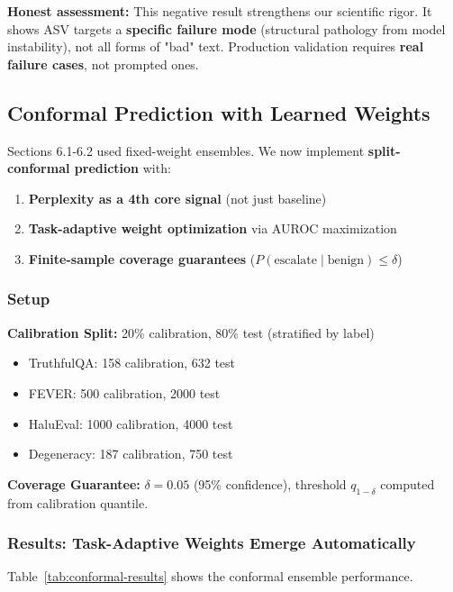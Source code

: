 \documentclass[11pt]{article}
\begin{document}
\textbf{Honest assessment:} This negative result strengthens our scientific rigor. It shows ASV targets a \textbf{specific failure mode} (structural pathology from model instability), not all forms of "bad" text. Production validation requires \textbf{real failure cases}, not prompted ones.

\subsection{Conformal Prediction with Learned Weights}
\label{sec:eval-conformal}

Sections 6.1-6.2 used fixed-weight ensembles. We now implement \textbf{split-conformal prediction} with:
\begin{enumerate}
\item \textbf{Perplexity as a 4th core signal} (not just baseline)
\item \textbf{Task-adaptive weight optimization} via AUROC maximization
\item \textbf{Finite-sample coverage guarantees} ($P(\text{escalate} \mid \text{benign}) \le \delta$)
\end{enumerate}

\subsubsection{Setup}

\textbf{Calibration Split:} 20\% calibration, 80\% test (stratified by label)
\begin{itemize}
\item TruthfulQA: 158 calibration, 632 test
\item FEVER: 500 calibration, 2000 test
\item HaluEval: 1000 calibration, 4000 test
\item Degeneracy: 187 calibration, 750 test
\end{itemize}

\textbf{Coverage Guarantee:} $\delta = 0.05$ (95\% confidence), threshold $q_{1-\delta}$ computed from calibration quantile.

\subsubsection{Results: Task-Adaptive Weights Emerge Automatically}

Table~\ref{tab:conformal-results} shows the conformal ensemble performance.
\end{document}
